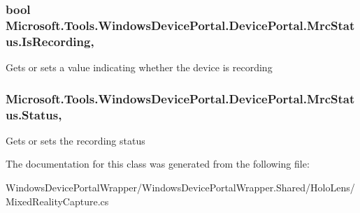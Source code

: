 \subsubsection[{\texorpdfstring{Is\+Recording}{IsRecording}}]{\setlength{\rightskip}{0pt plus 5cm}bool Microsoft.\+Tools.\+Windows\+Device\+Portal.\+Device\+Portal.\+Mrc\+Status.\+Is\+Recording\hspace{0.3cm}{\ttfamily [get]}, {\ttfamily [set]}}\hypertarget{class_microsoft_1_1_tools_1_1_windows_device_portal_1_1_device_portal_1_1_mrc_status_a81d8fa18ebdf97d8592d8e0858ee881a}{}\label{class_microsoft_1_1_tools_1_1_windows_device_portal_1_1_device_portal_1_1_mrc_status_a81d8fa18ebdf97d8592d8e0858ee881a}


Gets or sets a value indicating whether the device is recording 

\subsubsection[{\texorpdfstring{Status}{Status}}]{ Microsoft.\+Tools.\+Windows\+Device\+Portal.\+Device\+Portal.\+Mrc\+Status.\+Status\hspace{0.3cm}{\ttfamily [get]}, {\ttfamily [set]}}\hypertarget{class_microsoft_1_1_tools_1_1_windows_device_portal_1_1_device_portal_1_1_mrc_status_a1a5cc4c48bb6682f9182afe606c22df7}{}\label{class_microsoft_1_1_tools_1_1_windows_device_portal_1_1_device_portal_1_1_mrc_status_a1a5cc4c48bb6682f9182afe606c22df7}


Gets or sets the recording status 



The documentation for this class was generated from the following file\+:\begin{DoxyCompactItemize}
\item 
Windows\+Device\+Portal\+Wrapper/\+Windows\+Device\+Portal\+Wrapper.\+Shared/\+Holo\+Lens/Mixed\+Reality\+Capture.\+cs\end{DoxyCompactItemize}
